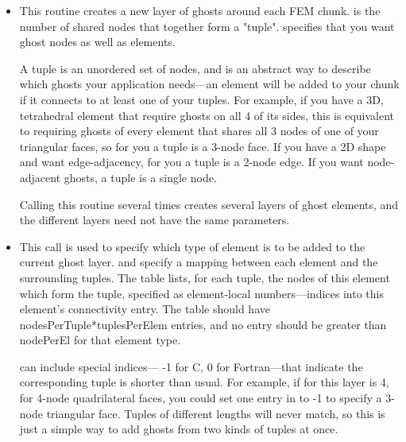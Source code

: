 \documentclass[10pt]{article}
\begin{document}
\begin{itemize}
\item

This routine creates a new layer of ghosts around each FEM chunk.  is the number of shared nodes that together form a "tuple".  specifies that you want ghost nodes as well as elements.

A tuple is an unordered set of nodes, and is an abstract way to describe which ghosts
your application needs---an element will be added to your chunk if it connects to at 
least one of your tuples.  For example, if you have a 3D, tetrahedral element that require ghosts 
on all 4 of its sides, this is equivalent to requiring ghosts of every element that shares all 3
nodes of one of your triangular faces, so for you a tuple is a 3-node face.  If you have a 2D shape
and want edge-adjacency, for you a tuple is a 2-node edge.  If you want node-adjacent ghosts,
a tuple is a single node.

Calling this routine several times creates several layers of ghost elements, and the different layers need not have the same parameters.

\item
{}

This call is used to specify which type of element is to be added to the current ghost layer.  and  specify a mapping between each element and the surrounding tuples.  The  table lists, for each tuple, the nodes of this element which form the tuple, specified as element-local numbers---indices into this element's connectivity entry. The  table should have nodesPerTuple*tuplesPerElem entries, and no entry should be greater than nodePerEl for that element type.

 can include special indices--- -1 for C, 0 for Fortran---that indicate the
corresponding tuple is shorter than usual.  For example, if  for this layer
is 4, for 4-node quadrilateral faces, you could set one entry in  to -1 to specify
a 3-node triangular face.  Tuples of different lengths will never match, so this is just
a simple way to add ghosts from two kinds of tuples at once.

\end{itemize}
\end{document}
